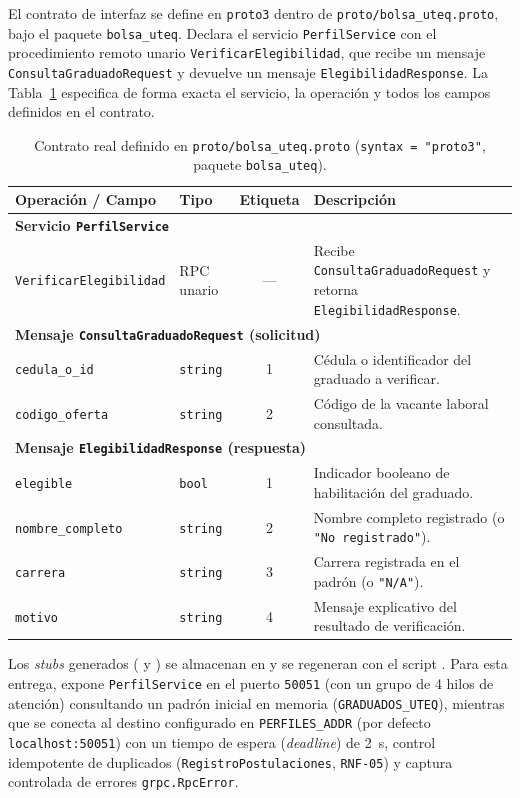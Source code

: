 \documentclass[11pt,a4paper]{article}
\begin{document}
El contrato de interfaz se define en \texttt{proto3} dentro de \texttt{proto/bolsa\_uteq.proto}, bajo el paquete \texttt{bolsa\_uteq}. Declara el servicio \texttt{PerfilService} con el procedimiento remoto unario \texttt{VerificarElegibilidad}, que recibe un mensaje \texttt{ConsultaGraduadoRequest} y devuelve un mensaje \texttt{ElegibilidadResponse}. La Tabla~\ref{tab:contrato-proto} especifica de forma exacta el servicio, la operación y todos los campos definidos en el contrato.

\begin{table}[htbp]
\centering
\caption{Contrato real definido en \texttt{proto/bolsa\_uteq.proto} (\texttt{syntax = "proto3"}, paquete \texttt{bolsa\_uteq}).}
\label{tab:contrato-proto}
\small
\begin{tabularx}{\textwidth}{l l c >{\raggedright\arraybackslash}X}
\toprule
\textbf{Operación / Campo} & \textbf{Tipo} & \textbf{Etiqueta} & \textbf{Descripción} \\
\midrule
\multicolumn{4}{l}{\textbf{Servicio \texttt{PerfilService}}} \\
\texttt{VerificarElegibilidad} & RPC unario & --- & Recibe \texttt{ConsultaGraduadoRequest} y retorna \texttt{ElegibilidadResponse}. \\
\midrule
\multicolumn{4}{l}{\textbf{Mensaje \texttt{ConsultaGraduadoRequest} (solicitud)}} \\
\texttt{cedula\_o\_id} & \texttt{string} & 1 & Cédula o identificador del graduado a verificar. \\
\texttt{codigo\_oferta} & \texttt{string} & 2 & Código de la vacante laboral consultada. \\
\midrule
\multicolumn{4}{l}{\textbf{Mensaje \texttt{ElegibilidadResponse} (respuesta)}} \\
\texttt{elegible} & \texttt{bool} & 1 & Indicador booleano de habilitación del graduado. \\
\texttt{nombre\_completo} & \texttt{string} & 2 & Nombre completo registrado (o \texttt{"No registrado"}). \\
\texttt{carrera} & \texttt{string} & 3 & Carrera registrada en el padrón (o \texttt{"N/A"}). \\
\texttt{motivo} & \texttt{string} & 4 & Mensaje explicativo del resultado de verificación. \\
\bottomrule
\end{tabularx}
\end{table}

Los \textit{stubs} generados ( y ) se almacenan en  y se regeneran con el script . Para esta entrega,  expone \texttt{PerfilService} en el puerto \texttt{50051} (con un grupo de 4 hilos de atención) consultando un padrón inicial en memoria (\texttt{GRADUADOS\_UTEQ}), mientras que  se conecta al destino configurado en \texttt{PERFILES\_ADDR} (por defecto \texttt{localhost:50051}) con un tiempo de espera (\textit{deadline}) de 2~s, control idempotente de duplicados (\texttt{RegistroPostulaciones}, \texttt{RNF-05}) y captura controlada de errores \texttt{grpc.RpcError}.
\end{document}
